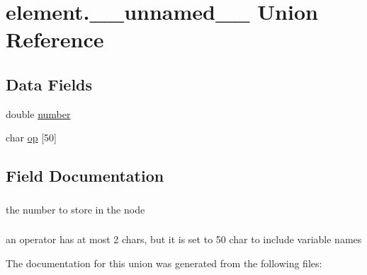 \hypertarget{unionelement_8____unnamed____}{\section{element.\-\_\-\-\_\-unnamed\-\_\-\-\_\- Union Reference}
\label{unionelement_8____unnamed____}
}
\subsection*{Data Fields}
\begin{DoxyCompactItemize}
\item 
double \hyperlink{unionelement_8____unnamed_____ab1bc248a7ff2b2e95569f56de68615df}{number}
\item 
char \hyperlink{unionelement_8____unnamed_____a36ef4d9fdf1d932c49de5a999a51f51e}{op} \mbox{[}50\mbox{]}
\end{DoxyCompactItemize}


\subsection{Field Documentation}
\hypertarget{unionelement_8____unnamed_____ab1bc248a7ff2b2e95569f56de68615df}{
\subsubsection[{number}]{\setlength{\rightskip}{0pt plus 5cm}}}\label{unionelement_8____unnamed_____ab1bc248a7ff2b2e95569f56de68615df}
the number to store in the node \hypertarget{unionelement_8____unnamed_____a36ef4d9fdf1d932c49de5a999a51f51e}{
\subsubsection[{op}]{\setlength{\rightskip}{0pt plus 5cm}}}\label{unionelement_8____unnamed_____a36ef4d9fdf1d932c49de5a999a51f51e}
an operator has at most 2 chars, but it is set to 50 char to include variable names 

The documentation for this union was generated from the following files\-: